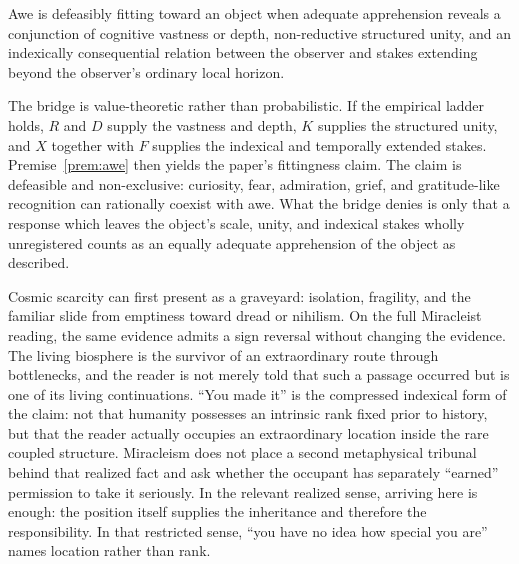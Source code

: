 \begin{premise}\label{prem:awe}
Awe is defeasibly fitting toward an object when adequate apprehension
reveals a conjunction of cognitive vastness or depth, non-reductive
structured unity, and an indexically consequential relation between the
observer and stakes extending beyond the observer's ordinary local
horizon.
\end{premise}

\noindent The bridge is value-theoretic rather than probabilistic. If
the empirical ladder holds, $R$ and $D$ supply the vastness and depth,
$K$ supplies the structured unity, and $X$ together with $F$ supplies
the indexical and temporally extended stakes. Premise~\ref{prem:awe}
then yields the paper's fittingness claim. The claim is defeasible and
non-exclusive: curiosity, fear, admiration, grief, and gratitude-like
recognition can rationally coexist with awe. What the bridge denies is
only that a response which leaves the object's scale, unity, and
indexical stakes wholly unregistered counts as an equally adequate
apprehension of the object as described.

Cosmic scarcity can first present as a graveyard: isolation, fragility,
and the familiar slide from emptiness toward dread or nihilism. On the
full Miracleist reading, the same evidence admits a sign reversal without
changing the evidence. The living biosphere is the survivor of an
extraordinary route through bottlenecks, and the reader is not merely
told that such a passage occurred but is one of its living continuations.
``You made it'' is the compressed indexical form of the claim: not that
humanity possesses an intrinsic rank fixed prior to history, but that the
reader actually occupies an extraordinary location inside the rare coupled
structure. Miracleism does not place a second metaphysical tribunal behind
that realized fact and ask whether the occupant has separately ``earned''
permission to take it seriously. In the relevant realized sense, arriving
here is enough: the position itself supplies the inheritance and therefore
the responsibility. In that restricted sense, ``you have no idea
how special you are'' names location rather than rank.

